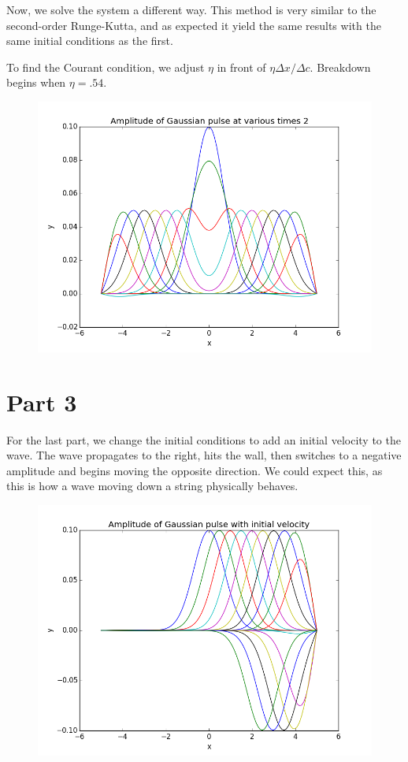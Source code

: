 \documentclass[11pt]{article}
\begin{document}
Now, we solve the system a different way. This method is very similar to the second-order Runge-Kutta, and as expected it yield the same results with the same initial conditions as the first. 

To find the Courant condition, we adjust $\eta$ in front of $\eta \Delta x/\Delta c$. Breakdown begins when $\eta = .54$.

\begin{figure}[H]
\centering
\includegraphics[scale=.5]{part2.png}
\end{figure}

\section{Part 3}

For the last part, we change the initial conditions to add an initial velocity to the wave. The wave propagates to the right, hits the wall, then switches to a negative amplitude and begins moving the opposite direction. We could expect this, as this is how a wave moving down a string physically behaves. 

\begin{figure}[H]
\centering
\includegraphics[scale=.5]{part3.png}
\end{figure}
\end{document}
